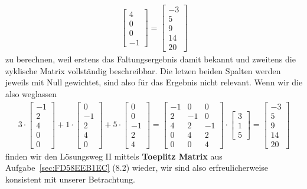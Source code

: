 \begin{ExCalc}
\begin{align}
\begin{bmatrix}
4\\
0\\
0\\
-1
\end{bmatrix}
=
\begin{bmatrix}
-3\\
 5\\
 9\\
14\\
20
\end{bmatrix}
\end{align}
zu berechnen, weil erstens das Faltungsergebnis damit bekannt und zweitens die
zyklische Matrix vollständig beschreibbar.
%
Die letzen beiden Spalten werden jeweils mit Null gewichtet, sind also
für das Ergebnis nicht relevant. Wenn wir die also weglassen
\begin{align}
3 \cdot
\begin{bmatrix}
-1\\
 2\\
 4\\
 0\\
 0
\end{bmatrix}
+ 1 \cdot
\begin{bmatrix}
0\\
-1\\
2\\
4\\
0
\end{bmatrix}
+ 5 \cdot
\begin{bmatrix}
0\\
0\\
-1\\
2\\
4
\end{bmatrix}
=
\begin{bmatrix}
-1  &   0  &   0\\
 2  &  -1  &   0\\
 4  &   2  &  -1\\
 0  &   4  &   2\\
 0  &   0  &   4
\end{bmatrix}
\cdot
\begin{bmatrix}
3\\1\\5
\end{bmatrix}
=
\begin{bmatrix}
-3\\
 5\\
 9\\
14\\
20
\end{bmatrix}
\end{align}
finden wir den Lösungsweg II mittels \textbf{Toeplitz Matrix} aus Aufgabe~\ref{sec:FD58EEB1EC} (8.2) wieder,
wir sind also erfreulicherweise konsistent mit unserer Betrachtung.



\end{ExCalc}
